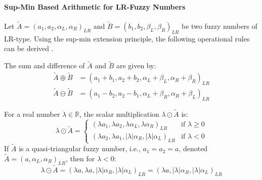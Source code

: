 \paragraph{Sup-Min Based Arithmetic for LR-Fuzzy Numbers}
Let $\tilde{A} = (a_1, a_2, \alpha_L, \alpha_R)_{LR}$ and $\tilde{B} = (b_1, b_2, \beta_L, \beta_R)_{LR}$ be two fuzzy numbers of LR-type. Using the sup-min extension principle, the following operational rules can be derived \cite[p.16]{FULLER2}.

\begin{proposition}
\label{prop:lr_add_sub}
The sum and difference of $\tilde{A}$ and $\tilde{B}$ are given by:
\begin{align}
\tilde{A} \oplus \tilde{B} &= (a_1+b_1, a_2+b_2, \alpha_L+\beta_L, \alpha_R+\beta_R)_{LR} \\
\tilde{A} \ominus \tilde{B} &= (a_1-b_2, a_2-b_1, \alpha_L+\beta_R, \alpha_R+\beta_L)_{LR}
\end{align}
\end{proposition}

\begin{proposition}
\label{prop:lr_scalar_mult}
For a real number $\lambda \in \mathbb{R}$, the scalar multiplication $\lambda \odot \tilde{A}$ is:
\begin{equation}
\lambda \odot \tilde{A} =
\begin{cases}
(\lambda a_1, \lambda a_2, \lambda\alpha_L, \lambda\alpha_R)_{LR} & \text{if } \lambda \ge 0 \\
(\lambda a_2, \lambda a_1, |\lambda|\alpha_R, |\lambda|\alpha_L)_{LR} & \text{if } \lambda < 0
\end{cases}
\end{equation}
If $\tilde{A}$ is a quasi-triangular fuzzy number, i.e., $a_1=a_2=a$, denoted $\tilde{A}=(a, \alpha_L, \alpha_R)_{LR}$, then for $\lambda < 0$:
\begin{equation}
\lambda \odot \tilde{A} = (\lambda a, \lambda a, |\lambda|\alpha_R, |\lambda|\alpha_L)_{LR} = (\lambda a, |\lambda|\alpha_R, |\lambda|\alpha_L)_{LR}
\end{equation}
\end{proposition}

